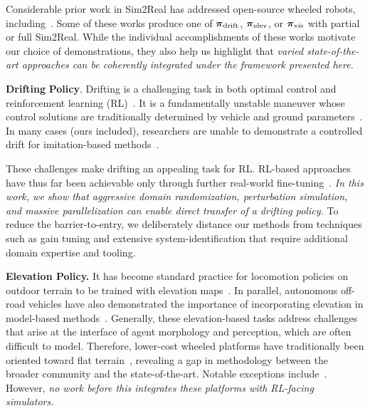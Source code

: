 
Considerable prior work in Sim2Real has addressed open-source wheeled robots, including~\cite{datar_toward_2024, salimpour_sim--real_2025, balaji_deepracer_2020, samak_towards_2023, xiao_anycar_2024, cutler_autonomous_2016, williams_information_2017, evans_comparing_2023}. Some of these works produce one of $\boldsymbol{\pi}_{\text{drift}}$, $\boldsymbol{\pi}_{\text{elev}}$, or $\boldsymbol{\pi}_{\text{vis}}$ with partial or full Sim2Real. While the individual accomplishments of these works motivate our choice of demonstrations, they also help us highlight that \textit{varied state-of-the-art approaches can be coherently integrated under the framework presented here}.

\textbf{Drifting} \textbf{Policy}. Drifting is a challenging task in both optimal control and reinforcement learning (RL)~\cite{gonzales_autonomous_2016, cai_high-speed_2020, djeumou_reference-free_2024}. It is a fundamentally unstable maneuver whose control solutions are traditionally determined by vehicle and ground parameters~\cite{chen_dynamic_2023}. In many cases (ours included), researchers are unable to demonstrate a controlled drift for imitation-based methods~\cite{cutler_autonomous_2016}. 

These challenges make drifting an appealing task for RL. RL-based approaches have thus far been achievable only through further real-world fine-tuning~\cite{cutler_autonomous_2016, williams_information_2017}.
\textit{In this work, we show that aggressive domain randomization, perturbation simulation, and massive parallelization can enable direct transfer of a drifting policy.}
To reduce the barrier-to-entry, we deliberately distance our methods from techniques such as gain tuning and extensive system-identification that require additional domain expertise and tooling.

\textbf{Elevation Policy.} It has become standard practice for locomotion policies on outdoor terrain to be trained with elevation maps~\cite{hoeller_anymal_2024}. 
In parallel, autonomous off-road vehicles have also demonstrated the importance of incorporating elevation in model-based methods~\cite{han_dynamics_2024, frey_roadrunner_2024, gibson_multi-step_2023}. Generally, these elevation-based tasks address challenges that arise at the interface of agent morphology and perception, which are often difficult to model. Therefore, 
lower-cost wheeled platforms have traditionally been oriented toward flat terrain~\cite{okelly_f1tenth_2020, balaji_deepracer_2020}, revealing a gap in methodology between the broader community and the state-of-the-art. Notable exceptions  
include~\cite{datar_toward_2024, stachowicz_fastrlap_2023, xu_reinforcement_2024}. However, \textit{no work before this integrates these platforms with RL-facing simulators.}

